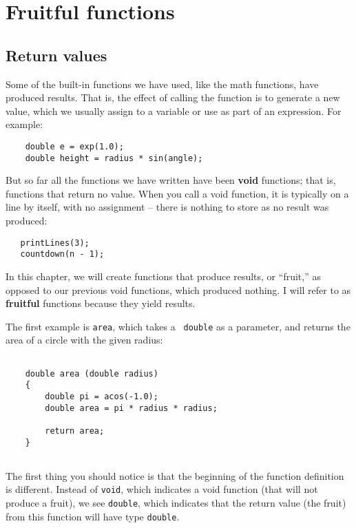 
\chapter{Fruitful functions}

\section{Return values}

Some of the built-in functions we have used, like the math
functions, have produced results.  That is, the effect of
calling the function is to generate a new value, which we
usually assign to a variable or use as part of an expression.
For example:


\begin{verbatim}
    double e = exp(1.0);
    double height = radius * sin(angle);
\end{verbatim}
%
But so far all the functions we have written have been {\bf void}
functions; that is, functions that return no value.  When you call
a void function, it is typically on a line by itself, with
no assignment -- there is nothing to store as no result was produced:

\begin{verbatim}
   printLines(3);
   countdown(n - 1);
\end{verbatim}
%
In this chapter, we will create functions that produce results, or ``fruit,'' 
as opposed to our previous void functions, which produced nothing. 
I will refer to as {\bf fruitful} functions because they yield results.

The first example is {\tt area}, which takes a {\tt
double} as a parameter, and returns the area of a circle with the
given radius:


\begin{verbatim}

    double area (double radius) 
    {
        double pi = acos(-1.0); 
        double area = pi * radius * radius;
        
        return area;
    }
    
\end{verbatim}
%
The first thing you should notice is that the beginning of the
function definition is different.  Instead of {\tt void}, which
indicates a void function (that will not produce a fruit), we see {\tt double}, which indicates that
the return value (the fruit) from this function will have type {\tt double}. 

